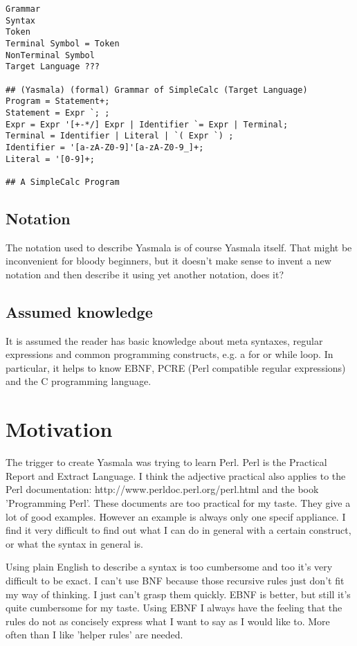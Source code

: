 \documentclass[a4paper]{report}
\begin{document}
\begin{verbatim}
Grammar
Syntax
Token
Terminal Symbol = Token
NonTerminal Symbol
Target Language ???

## (Yasmala) (formal) Grammar of SimpleCalc (Target Language)
Program = Statement+;
Statement = Expr `; ;
Expr = Expr '[+-*/] Expr | Identifier `= Expr | Terminal;
Terminal = Identifier | Literal | `( Expr `) ;
Identifier = '[a-zA-Z0-9]'[a-zA-Z0-9_]+;
Literal = '[0-9]+;

## A SimpleCalc Program 
\end{verbatim}

\label{Notation}
\subsection{Notation}

The notation used to describe Yasmala is of course Yasmala itself. That might be
inconvenient for bloody beginners, but it doesn't make sense to invent a new
notation and then describe it using yet another notation, does it?

\subsection{Assumed knowledge}
It is assumed the reader has basic knowledge about meta syntaxes, regular
expressions and common programming constructs, e.g. a for or while loop. In
particular, it helps to know EBNF, PCRE (Perl compatible regular expressions)
and the C programming language.

\section{Motivation}
The trigger to create Yasmala was trying to learn Perl. Perl is the Practical
Report and Extract Language. I think the adjective practical also applies to the
Perl documentation: http://www.perldoc.perl.org/perl.html and the book
'Programming Perl'. These documents are too practical for my taste. They give a
lot of good examples. However an example is always only one specif appliance. I
find it very difficult to find out what I can do in general with a certain
construct, or what the syntax in general is.

Using plain English to describe a syntax is too cumbersome and too it's very
difficult to be exact. I can't use BNF because those recursive rules just don't
fit my way of thinking. I just can't grasp them quickly. EBNF is better, but
still it's quite cumbersome for my taste. Using EBNF I always have the feeling
that the rules do not as concisely express what I want to say as I would like to.
More often than I like 'helper rules' are needed.
\end{document}

